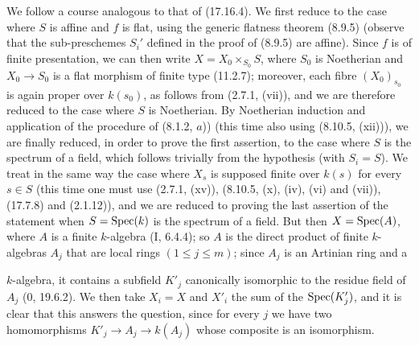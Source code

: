 We follow a course analogous to that of (17.16.4). We first reduce to the case where $S$ is affine and $f$ is flat, using the generic flatness theorem (8.9.5) (observe that the sub-preschemes $S_i'$ defined in the proof of (8.9.5) are affine). Since $f$ is of finite presentation, we can then write $X=X_0\times_{S_0}S$, where $S_0$ is Noetherian and $X_0\to S_0$ is a flat morphism of finite type (11.2.7); moreover, each fibre $(X_0)_{s_0}$ is again proper over $k(s_0)$, as follows from (2.7.1, (vii)), and we are therefore reduced to the case where $S$ is Noetherian. By Noetherian induction and application of the procedure of (8.1.2, $a$)) (this time also using (8.10.5, (xii))), we are finally reduced, in order to prove the first assertion, to the case where $S$ is the spectrum of a field, which follows trivially from the hypothesis (with $S_i=S$). We treat in the same way the case where $X_s$ is supposed finite over $k(s)$ for every $s\in S$ (this time one must use (2.7.1, (xv)), (8.10.5, (x), (iv), (vi) and (vii)), (17.7.8) and (2.1.12)), and we are reduced to proving the last assertion of the statement when $S=\operatorname{Spec}(k)$ is the spectrum of a field. But then $X=\operatorname{Spec}(A)$, where $A$ is a finite $k$-algebra (I, 6.4.4); so $A$ is the direct product of finite $k$-algebras $A_j$ that are local rings $(1\leq j\leq m)$; since $A_j$ is an Artinian ring and a


$k$-algebra, it contains a subfield $K'_j$ canonically isomorphic to the residue field of $A_j$ (0, 19.6.2). We then take $X_i=X$ and $X'_i$ the sum of the $\operatorname{Spec}(K'_j)$, and it is clear that this answers the question, since for every $j$ we have two homomorphisms $K'_j\to A_j\to k(A_j)$ whose composite is an isomorphism.
